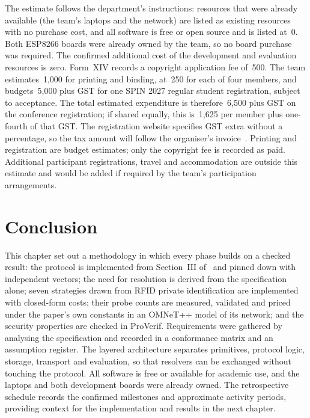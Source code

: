 The estimate follows the department's instructions: resources that were already available (the team's laptops and the network) are listed as existing resources with no purchase cost, and all software is free or open source and is listed at \rupee\,0. Both ESP8266 boards were already owned by the team, so no board purchase was required. The confirmed additional cost of the development and evaluation resources is zero. Form~XIV records a copyright application fee of \rupee\,500. The team estimates \rupee\,1,000 for printing and binding, at \rupee\,250 for each of four members, and budgets \rupee\,5,000 plus GST for one SPIN 2027 regular student registration, subject to acceptance. The total estimated expenditure is therefore \rupee\,6,500 plus GST on the conference registration; if shared equally, this is \rupee\,1,625 per member plus one-fourth of that GST. The registration website specifies GST extra without a percentage, so the tax amount will follow the organiser's invoice~\cite{spin2027registration}. Printing and registration are budget estimates; only the copyright fee is recorded as paid. Additional participant registrations, travel and accommodation are outside this estimate and would be added if required by the team's participation arrangements.

\section{Conclusion}
This chapter set out a methodology in which every phase builds on a checked result: the protocol is implemented from Section~III of~\cite{base} and pinned down with independent vectors; the need for resolution is derived from the specification alone; seven strategies drawn from RFID private identification are implemented with closed-form costs; their probe counts are measured, validated and priced under the paper's own constants in an OMNeT++ model of its network; and the security properties are checked in ProVerif. Requirements were gathered by analysing the specification and recorded in a conformance matrix and an assumption register. The layered architecture separates primitives, protocol logic, storage, transport and evaluation, so that resolvers can be exchanged without touching the protocol. All software is free or available for academic use, and the laptops and both development boards were already owned. The retrospective schedule records the confirmed milestones and approximate activity periods, providing context for the implementation and results in the next chapter.
